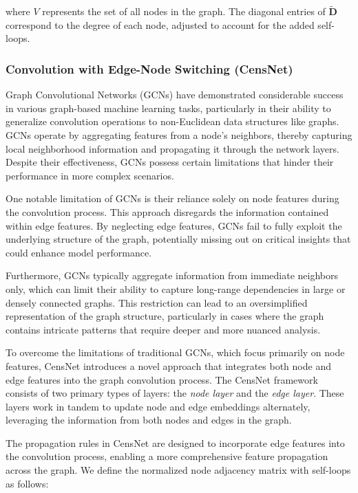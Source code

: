 where \( V \) represents the set of all nodes in the graph. The diagonal entries of \( \tilde{\mathbf{D}} \) correspond to the degree of each node, adjusted to account for the added self-loops.

\subsubsection{Convolution with Edge-Node Switching (CensNet)}

Graph Convolutional Networks (GCNs) have demonstrated considerable success in various graph-based machine learning tasks, particularly in their ability to generalize convolution operations to non-Euclidean data structures like graphs. GCNs operate by aggregating features from a node's neighbors, thereby capturing local neighborhood information and propagating it through the network layers. Despite their effectiveness, GCNs possess certain limitations that hinder their performance in more complex scenarios.

One notable limitation of GCNs is their reliance solely on node features during the convolution process. This approach disregards the information contained within edge features. By neglecting edge features, GCNs fail to fully exploit the underlying structure of the graph, potentially missing out on critical insights that could enhance model performance.

Furthermore, GCNs typically aggregate information from immediate neighbors only, which can limit their ability to capture long-range dependencies in large or densely connected graphs. This restriction can lead to an oversimplified representation of the graph structure, particularly in cases where the graph contains intricate patterns that require deeper and more nuanced analysis.

To overcome the limitations of traditional GCNs, which focus primarily on node features, CensNet introduces a novel approach that integrates both node and edge features into the graph convolution process. The CensNet framework consists of two primary types of layers: the \textit{node layer} and the \textit{edge layer}. These layers work in tandem to update node and edge embeddings alternately, leveraging the information from both nodes and edges in the graph.

The propagation rules in CensNet are designed to incorporate edge features into the convolution process, enabling a more comprehensive feature propagation across the graph. We define the normalized node adjacency matrix with self-loops as follows:

